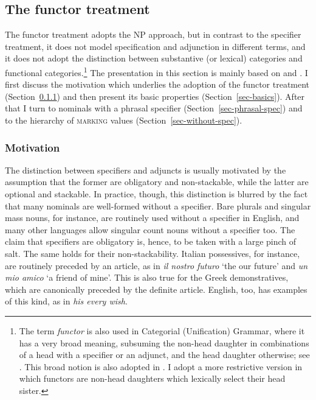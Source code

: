 \documentclass[output=paper
	        ,collection
	        ,collectionchapter
 	        ,biblatex
                ,babelshorthands
                ,newtxmath
                ,draftmode
                ,colorlinks, citecolor=brown
]{langscibook}
\begin{document}
\subsection{The functor treatment} 
\label{funct}


The functor treatment adopts the NP approach, but in contrast to the specifier treatment,  
it does not model specification and adjunction in different terms, and it does not adopt 
the distinction between substantive (or lexical) categories and functional 
categories.\footnote{The term \emph{functor} is also used in Categorial (Unification) Grammar, 
where it has a very broad meaning, subsuming the non-head daughter in combinations of a 
head with a specifier or an adjunct, and the head daughter otherwise;
see \citet{Bouma88}. This broad notion is also adopted in 
\citet{Reape94}. I adopt a more restrictive version in which functors 
are non-head daughters which lexically select their head sister.}  
The presentation in this section is mainly based on \citet{VanEynde06} 
and \citet{Allegranza06}. I first discuss the motivation which underlies the adoption 
of the functor treatment (Section~\ref{motiv}) and then present its basic
properties (Section~\ref{sec-basics}). After that I turn to nominals with a 
phrasal specifier (Section~\ref{sec-phrasal-spec}) 
and to the hierarchy of \textsc{marking} values (Section~\ref{sec-without-spec}).    


\subsubsection{Motivation} 
\label{motiv}


The distinction between specifiers and adjuncts is usually motivated by 
the assumption that the former are obligatory and non-stackable, while the latter  
are optional and stackable. In practice, though, this distinction 
is blurred by the fact that many nominals are well-formed without a specifier.
Bare plurals and singular mass nouns, for instance, are routinely used without a 
specifier in English, and many other languages allow singular count nouns without 
a specifier too. The claim that specifiers are obligatory is, hence, to be taken 
with a large pinch of salt. The same holds for their non-stackability. 
Italian possessives, for instance, are routinely preceded by an article, as in 
\emph{il nostro futuro} `the our future' and \emph{un mio amico} `a friend of mine'.     
This is also true for the Greek demonstratives, which are canonically preceded by the 
definite article. English, too, has examples of this kind, as in \emph{his every wish}.    
\end{document}
